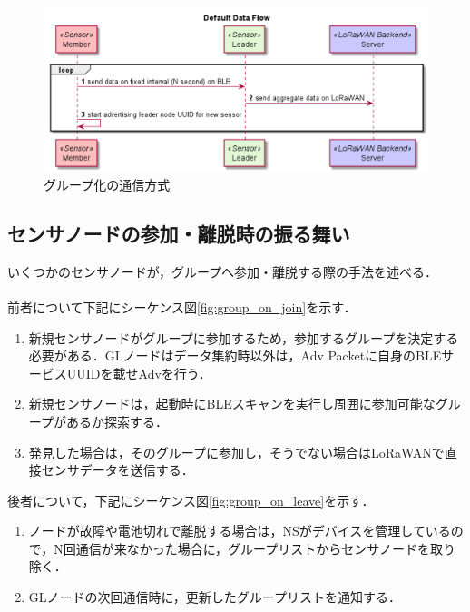 \begin{figure}[]
    \begin{center}
    \includegraphics[width=13cm]{figures/グループ化の通信方式.png}
    \caption{グループ化の通信方式}
    \label{fig:default_data_flow}
    \end{center}
\end{figure}

\subsection{センサノードの参加・離脱時の振る舞い}
いくつかのセンサノードが，グループへ参加・離脱する際の手法を述べる．\\ \\
前者について下記にシーケンス図\ref{fig:group_on_join}を示す．

\begin{enumerate}
    \item 新規センサノードがグループに参加するため，参加するグループを決定する必要がある．GLノードはデータ集約時以外は，Adv Packetに自身のBLEサービスUUIDを載せAdvを行う．
    \item 新規センサノードは，起動時にBLEスキャンを実行し周囲に参加可能なグループがあるか探索する．
    \item 発見した場合は，そのグループに参加し，そうでない場合はLoRaWANで直接センサデータを送信する．
\end{enumerate}

後者について，下記にシーケンス図\ref{fig:group_on_leave}を示す．

\begin{enumerate}
    \item ノードが故障や電池切れで離脱する場合は，NSがデバイスを管理しているので，N回通信が来なかった場合に，グループリストからセンサノードを取り除く．
    \item GLノードの次回通信時に，更新したグループリストを通知する．
\end{enumerate}

